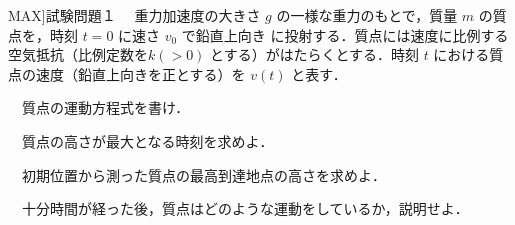 \documentclass[luatex,fontsize=8pt,paper=b5,twoside,report]{jlreq}%
\begin{document}
\begin{ascolorbox4}[\importances[重要度]{MAX}]{試験問題１}
  　重力加速度の大きさ $g$ の一様な重力のもとで，質量 $m$ の質点を，時刻 $t = 0$ に速さ $v_{0}$ で鉛直上向き
  に投射する．質点には速度に比例する空気抵抗（比例定数を$ k (> 0) $ とする）がはたらくとする．時刻 $t$ における質点の速度（鉛直上向きを正とする）を $v(t)$ と表す．
  \begin{mondaiA}
    \item 　質点の運動方程式を書け．
    \item 　質点の高さが最大となる時刻を求めよ．
    \item 　初期位置から測った質点の最高到達地点の高さを求めよ．
    \item 　十分時間が経った後，質点はどのような運動をしているか，説明せよ．
  \end{mondaiA}
\end{ascolorbox4}
\end{document}

